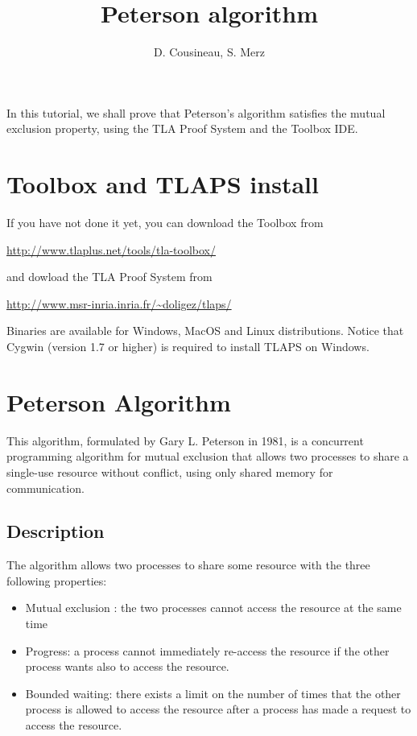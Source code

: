 \documentclass{enonce}
\title{Peterson algorithm}
\author{D. Cousineau, S. Merz}
\date{}
\begin{document}
\maketitle

\noindent In this tutorial, we shall prove that Peterson's algorithm satisfies the mutual exclusion property, using the TLA Proof System and the Toolbox IDE.


\section{Toolbox and TLAPS install}
If you have not done it yet, you can download the Toolbox from 
\begin{center}
\url{http://www.tlaplus.net/tools/tla-toolbox/}
\end{center}
and dowload the TLA Proof System from
\begin{center}
\url{http://www.msr-inria.inria.fr/~doligez/tlaps/}
\end{center}

\noindent Binaries are available for Windows, MacOS and Linux distributions. Notice that Cygwin (version 1.7 or higher) is required to install TLAPS on Windows.

\section{Peterson Algorithm}
This algorithm, formulated by Gary L. Peterson in 1981, is a concurrent programming algorithm for mutual exclusion that allows two processes to share a single-use resource without conflict, using only shared memory for communication.

\subsection{Description}
The algorithm allows two processes to share some resource with the three following properties:
\begin{itemize}
\item Mutual exclusion : the two processes cannot access the resource at the same time
\item Progress: a process cannot immediately re-access the resource if the other process wants also to access the resource.
\item Bounded waiting: there exists a limit on the number of times that the other process is allowed to access the resource after a process has made a request to access the resource.
\end{itemize}
\end{document}
